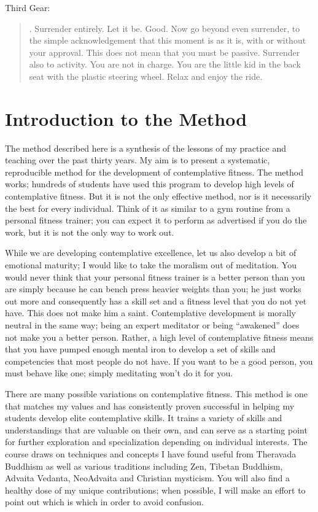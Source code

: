 \documentclass[a5paper,10pt,english]{book}
\begin{document}
\sphinxAtStartPar
Third Gear:
\begin{quote}

. Surrender entirely. Let it be. Good. Now go beyond even
surrender, to the simple acknowledgement that this moment is as it is,
with or without your approval. This does not mean that you must be
passive. Surrender also to activity. You are not in charge. You are the
little kid in the back seat with the plastic steering wheel. Relax and
enjoy the ride.
\end{quote}


\section{Introduction to the Method}
\label{\detokenize{main-3:introduction-to-the-method}}
\sphinxAtStartPar
The method described here is a synthesis of the lessons of my practice
and teaching over the past thirty years. My aim is to present a
systematic, reproducible method for the development of contemplative
fitness. The method works; hundreds of students have used this program
to develop high levels of contemplative fitness. But it is not the only
effective method, nor is it necessarily the best for every individual.
Think of it as similar to a gym routine from a personal fitness trainer;
you can expect it to perform as advertised if you do the work, but it is
not the only way to work out.

\sphinxAtStartPar
While we are developing contemplative excellence, let us also develop a
bit of emotional maturity; I would like to take the moralism out of
meditation. You would never think that your personal fitness trainer is
a better person than you are simply because he can bench press heavier
weights than you; he just works out more and consequently has a skill
set and a fitness level that you do not yet have. This does not make him
a saint. Contemplative development is morally neutral in the same way;
being an expert meditator or being “awakened” does not make you a better
person. Rather, a high level of contemplative fitness means that you
have pumped enough mental iron to develop a set of skills and
competencies that most people do not have. If you want to be a good
person, you must behave like one; simply meditating won’t do it for you.

\sphinxAtStartPar
There are many possible variations on contemplative fitness. This method
is one that matches my values and has consistently proven successful in
helping my students develop elite contemplative skills. It trains a
variety of skills and understandings that are valuable on their own, and
can serve as a starting point for further exploration and specialization
depending on individual interests. The course draws on techniques and
concepts I have found useful from Theravada Buddhism as well as various
traditions including Zen, Tibetan Buddhism, Advaita Vedanta, Neo\sphinxhyphen{}Advaita
and Christian mysticism. You will also find a healthy dose of my unique
contributions; when possible, I will make an effort to point out which
is which in order to avoid confusion.
\end{document}
